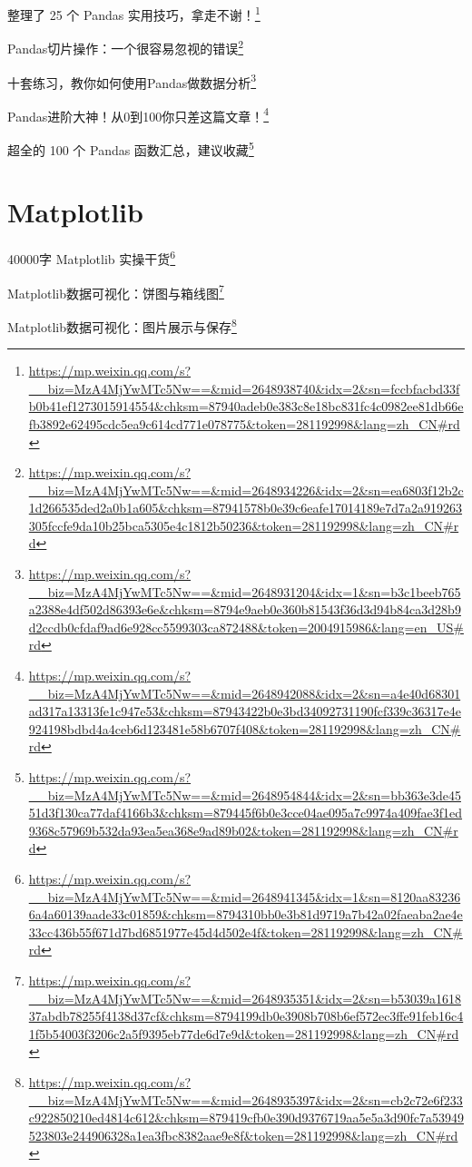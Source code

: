 \documentclass[]{ctexbook}
\renewcommand{\href}[2]{#2\footnote{\url{#1}}}
\begin{document}
\href{https://mp.weixin.qq.com/s?__biz=MzA4MjYwMTc5Nw==\&mid=2648938740\&idx=2\&sn=fccbfacbd33fb0b41ef1273015914554\&chksm=87940adeb0e383c8e18bc831fc4c0982ee81db66efb3892e62495cdc5ea9c614cd771e078775\&token=281192998\&lang=zh_CN\#rd}{整理了 25 个 Pandas 实用技巧，拿走不谢！}

\href{https://mp.weixin.qq.com/s?__biz=MzA4MjYwMTc5Nw==\&mid=2648934226\&idx=2\&sn=ea6803f12b2c1d266535ded2a0b1a605\&chksm=87941578b0e39c6eafe17014189e7d7a2a919263305fccfe9da10b25bca5305e4c1812b50236\&token=281192998\&lang=zh_CN\#rd}{Pandas切片操作：一个很容易忽视的错误}

\href{https://mp.weixin.qq.com/s?__biz=MzA4MjYwMTc5Nw==\&mid=2648931204\&idx=1\&sn=b3c1beeb765a2388e4df502d86393e6e\&chksm=8794e9aeb0e360b81543f36d3d94b84ca3d28b9d2ccdb0cfdaf9ad6e928cc5599303ca872488\&token=2004915986\&lang=en_US\#rd}{十套练习，教你如何使用Pandas做数据分析}

\href{https://mp.weixin.qq.com/s?__biz=MzA4MjYwMTc5Nw==\&mid=2648942088\&idx=2\&sn=a4e40d68301ad317a13313fe1c947e53\&chksm=87943422b0e3bd34092731190fcf339c36317e4e924198bdbd4a4ceb6d123481e58b6707f408\&token=281192998\&lang=zh_CN\#rd}{Pandas进阶大神！从0到100你只差这篇文章！}

\href{https://mp.weixin.qq.com/s?__biz=MzA4MjYwMTc5Nw==\&mid=2648954844\&idx=2\&sn=bb363e3de4551d3f130ca77daf4166b3\&chksm=879445f6b0e3cce04ae095a7c9974a409fae3f1ed9368c57969b532da93ea5ea368e9ad89b02\&token=281192998\&lang=zh_CN\#rd}{超全的 100 个 Pandas 函数汇总，建议收藏}

\hypertarget{matplotlib}{%
\section{Matplotlib}\label{matplotlib}}

\href{https://mp.weixin.qq.com/s?__biz=MzA4MjYwMTc5Nw==\&mid=2648941345\&idx=1\&sn=8120aa832366a4a60139aade33c01859\&chksm=8794310bb0e3b81d9719a7b42a02faeaba2ae4e33cc436b55f671d7bd6851977e45d4d502e4f\&token=281192998\&lang=zh_CN\#rd}{40000字 Matplotlib 实操干货}

\href{https://mp.weixin.qq.com/s?__biz=MzA4MjYwMTc5Nw==\&mid=2648935351\&idx=2\&sn=b53039a161837abdb78255f4138d37cf\&chksm=8794199db0e3908b708b6ef572ec3ffe91feb16c41f5b54003f3206c2a5f9395eb77de6d7e9d\&token=281192998\&lang=zh_CN\#rd}{Matplotlib数据可视化：饼图与箱线图}

\href{https://mp.weixin.qq.com/s?__biz=MzA4MjYwMTc5Nw==\&mid=2648935397\&idx=2\&sn=cb2c72e6f233c922850210ed4814c612\&chksm=879419cfb0e390d9376719aa5e5a3d90fc7a53949523803e244906328a1ea3fbc8382aae9e8f\&token=281192998\&lang=zh_CN\#rd}{Matplotlib数据可视化：图片展示与保存}
\end{document}
